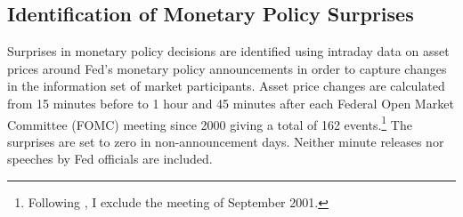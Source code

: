 {\subsection{Identification of Monetary Policy Surprises} \label{sec:USMPS}
\iftoggle{toclinks}{\gototoc}{} %


Surprises in monetary policy decisions are identified using intraday data on asset prices around Fed's monetary policy announcements in order to capture changes in the information set of market participants. %
Asset price changes are calculated from 15 minutes before to 1 hour and 45 minutes after each Federal Open Market Committee (FOMC) meeting since 2000 giving a total of 162 events.\footnote{ Following \cite{GSS:2005a}, I exclude the meeting of September 2001.} %
The surprises are set to zero in non-announcement days. %
Neither minute releases nor speeches by Fed officials are included. 

}
